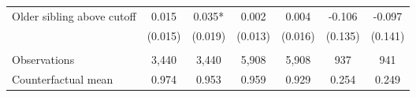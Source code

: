 {{\begin{tabular}{lcccccc}
Older sibling above cutoff&       0.015   &       0.035*  &       0.002   &       0.004   &      -0.106   &      -0.097   \\
                    &     (0.015)   &     (0.019)   &     (0.013)   &     (0.016)   &     (0.135)   &     (0.141)   \\
                    &               &               &               &               &               &               \\
Observations        &       3,440   &       3,440   &       5,908   &       5,908   &         937   &         941   \\
Counterfactual mean &       0.974   &       0.953   &       0.959   &       0.929   &       0.254   &       0.249   \\
 

\bottomrule
\end{tabular}
}
}
